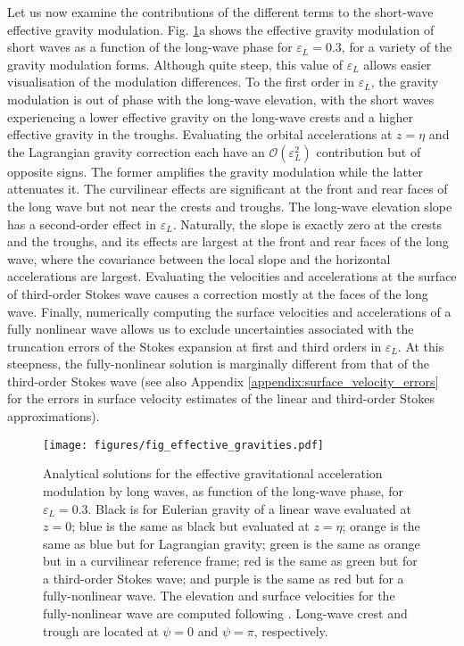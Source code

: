 \documentclass[lineno]{jfm}
\begin{document}
Let us now examine the contributions of the different terms to the short-wave
effective gravity modulation.
Fig. \ref{fig:effective_gravities}a shows the effective gravity modulation of
short waves as a function of the long-wave phase for $\varepsilon_L = 0.3$, for
a variety of the gravity modulation forms.
Although quite steep, this value of $\varepsilon_L$ allows easier visualisation
of the modulation differences.
To the first order in $\varepsilon_L$, the gravity modulation is out of phase
with the long-wave elevation, with the short waves experiencing a lower effective
gravity on the long-wave crests and a higher effective gravity in the troughs.
Evaluating the orbital accelerations at $z=\eta$ and the Lagrangian gravity
correction each have an $\mathcal{O}(\varepsilon_L^2)$ contribution but of
opposite signs.
The former amplifies the gravity modulation while the latter attenuates it.
The curvilinear effects are significant at the front and rear faces of the long
wave but not near the crests and troughs.
The long-wave elevation slope has a second-order effect in $\varepsilon_L$.
Naturally, the slope is exactly zero at the crests and the troughs, and its
effects are largest at the front and rear faces of the long wave, where the
covariance between the local slope and the horizontal accelerations are largest.
Evaluating the velocities and accelerations at the surface of third-order Stokes
wave causes a correction mostly at the faces of the long wave.
Finally, numerically computing the surface velocities and accelerations of a
fully nonlinear wave allows us to exclude uncertainties associated with the
truncation errors of the Stokes expansion at first and third orders in
$\varepsilon_L$.
At this steepness, the fully-nonlinear solution is marginally different from
that of the third-order Stokes wave
(see also Appendix \ref{appendix:surface_velocity_errors} for the errors
in surface velocity estimates of the linear and third-order Stokes
approximations).

\begin{figure}
\centering
\texttt{[image: figures/fig\_effective\_gravities.pdf]}
\caption{
  Analytical solutions for the effective gravitational acceleration
  modulation by long waves, as function of the long-wave phase, for $\varepsilon_L = 0.3$.
  Black is for Eulerian gravity of a linear wave evaluated at $z=0$;
  blue is the same as black but evaluated at $z=\eta$;
  orange is the same as blue but for Lagrangian gravity;
  green is the same as orange but in a curvilinear reference frame;
  red is the same as green but for a third-order Stokes wave;
  and purple is the same as red but for a fully-nonlinear wave.
  The elevation and surface velocities for the fully-nonlinear wave are computed
  following \citet{clamond2018accurate}.
  Long-wave crest and trough are located at $\psi = 0$ and $\psi = \pi$,
  respectively.
}
\label{fig:effective_gravities}
\end{figure}
\end{document}
